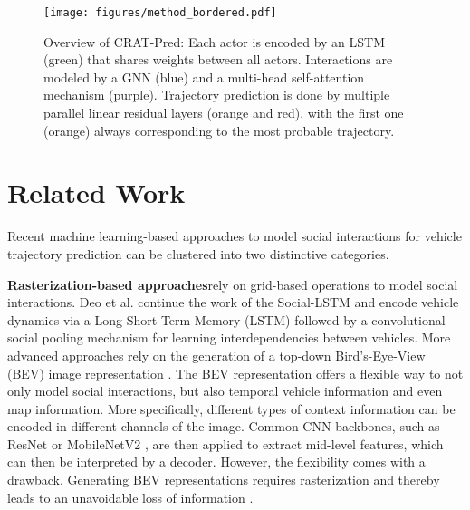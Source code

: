 \documentclass[letterpaper, 10 pt, conference]{ieeeconf}
\begin{document}
\begin{figure*}[thpb]
	\centering
	\texttt{[image: figures/method\_bordered.pdf]}
	\vspace{-0.6cm}
	\caption{Overview of CRAT-Pred: Each actor is encoded by an LSTM (green) that shares weights between all actors. Interactions are modeled by a GNN (blue) and a multi-head self-attention mechanism (purple). Trajectory prediction is done by multiple parallel linear residual layers (orange and red), with the first one (orange) always corresponding to the most probable trajectory.}
	\label{fig:trajectory_prediction_model}
\end{figure*}

\section{Related Work}
Recent machine learning-based approaches to model social interactions for vehicle trajectory prediction can be clustered into two distinctive categories.

\textbf{Rasterization-based approaches}\quad rely on grid-based operations to model social interactions.
Deo et al. \cite{Deo2018} continue the work of the Social-LSTM \cite{Alahi2016} and encode vehicle dynamics via a Long Short-Term Memory (LSTM) followed by a convolutional social pooling mechanism for learning interdependencies between vehicles.
More advanced approaches rely on the generation of a top-down Bird's-Eye-View (BEV) image representation \cite{Hong2019, Chai2020, Djuric2020, Strohbeck2020}.
The BEV representation offers a flexible way to not only model social interactions, but also temporal vehicle information and even map information.
More specifically, different types of context information can be encoded in different channels of the image.
Common CNN backbones, such as ResNet \cite{Chai2020, Djuric2020} or MobileNetV2 \cite{Djuric2020, Strohbeck2020}, are then applied to extract mid-level features, which can then be interpreted by a decoder.
However, the flexibility comes with a drawback.
Generating BEV representations requires rasterization and thereby leads to an unavoidable loss of information \cite{Liang2020}.
\end{document}
